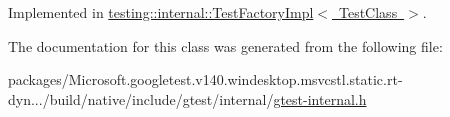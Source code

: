 Implemented in \mbox{\hyperlink{classtesting_1_1internal_1_1_test_factory_impl_a8860c89bdb06450a5d5e8137ebd9d775}{testing\+::internal\+::\+Test\+Factory\+Impl$<$ Test\+Class $>$}}.



The documentation for this class was generated from the following file\+:\begin{DoxyCompactItemize}
\item 
packages/\+Microsoft.\+googletest.\+v140.\+windesktop.\+msvcstl.\+static.\+rt-\/dyn.../build/native/include/gtest/internal/\mbox{\hyperlink{gtest-internal_8h}{gtest-\/internal.\+h}}\end{DoxyCompactItemize}
